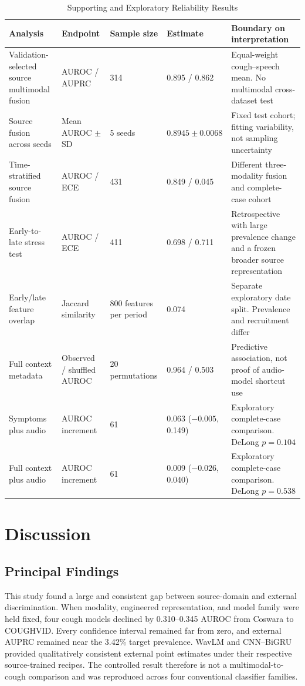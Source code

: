 \documentclass[journal]{IEEEtran}
\begin{document}
\begin{table}[t]
\caption{Supporting and Exploratory Reliability Results}
\label{tab:support}
\centering
\footnotesize
\begin{tabular}{L{3.2cm}L{2.5cm}L{2.0cm}L{2.0cm}L{4.1cm}}
\toprule
Analysis & Endpoint & Sample size & Estimate & Boundary on interpretation \\
\midrule
Validation-selected source multimodal fusion & AUROC / AUPRC & 314 & 0.895 / 0.862 & Equal-weight cough--speech mean. No multimodal cross-dataset test \\
Source fusion across seeds & Mean AUROC $\pm$ SD & 5 seeds & $0.8945\pm0.0068$ & Fixed test cohort; fitting variability, not sampling uncertainty \\
Time-stratified source fusion & AUROC / ECE & 431 & 0.849 / 0.045 & Different three-modality fusion and complete-case cohort \\
Early-to-late stress test & AUROC / ECE & 411 & 0.698 / 0.711 & Retrospective with large prevalence change and a frozen broader source representation \\
Early/late feature overlap & Jaccard similarity & 800 features per period & 0.074 & Separate exploratory date split. Prevalence and recruitment differ \\
Full context metadata & Observed / shuffled AUROC & 20 permutations & 0.964 / 0.503 & Predictive association, not proof of audio-model shortcut use \\
Symptoms plus audio & AUROC increment & 61 & 0.063 ($-0.005$, 0.149) & Exploratory complete-case comparison. DeLong $p=0.104$ \\
Full context plus audio & AUROC increment & 61 & 0.009 ($-0.026$, 0.040) & Exploratory complete-case comparison. DeLong $p=0.538$ \\
\bottomrule
\end{tabular}
\end{table}

\section{Discussion}

\subsection{Principal Findings}

This study found a large and consistent gap between source-domain and external discrimination. When modality, engineered representation, and model family were held fixed, four cough models declined by 0.310--0.345 AUROC from Coswara to COUGHVID. Every confidence interval remained far from zero, and external AUPRC remained near the 3.42\% target prevalence. WavLM and CNN--BiGRU provided qualitatively consistent external point estimates under their respective source-trained recipes. The controlled result therefore is not a multimodal-to-cough comparison and was reproduced across four conventional classifier families.
\end{document}
